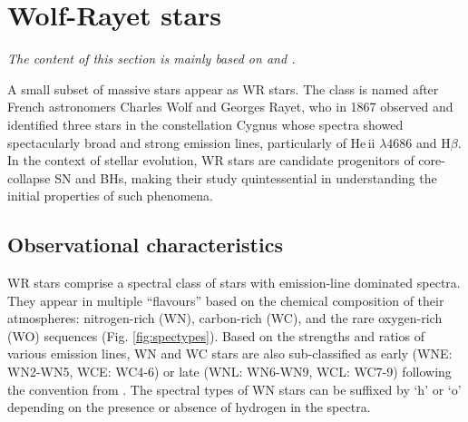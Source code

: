  

\section{Wolf-Rayet stars}\label{sect:wr_intro}

\textit{The content of this section is mainly based on \citet{crowther_physical_2007} and \citet{langer_presupernova_2012}.}

A small subset of massive stars appear as WR stars. The class is named after French astronomers Charles Wolf and Georges Rayet, who in 1867 observed and identified three stars in the constellation Cygnus whose spectra showed spectacularly broad and strong emission lines, particularly of He\,{\sc ii} $\lambda 4686$ and H$\beta$. In the context of stellar evolution, WR stars are candidate progenitors of core-collapse SN and BHs, making their study quintessential in understanding the initial properties of such phenomena. 

\subsection{Observational characteristics}\label{sect:wr_obs_char}

WR stars comprise a spectral class of stars with emission-line dominated spectra. They appear in multiple ``flavours'' based on the chemical composition of their atmospheres: nitrogen-rich (WN), carbon-rich (WC), and the rare oxygen-rich (WO) sequences (Fig. \ref{fig:spectypes}). Based on the strengths and ratios of various emission lines, WN and WC stars are also sub-classified as early (WNE: WN2-WN5, WCE: WC4-6) or late (WNL: WN6-WN9, WCL: WC7-9) following the convention from \citet{smith_revised_1968}. The spectral types of WN stars can be suffixed by `h' or `o' depending on the presence or absence of hydrogen in the spectra.

